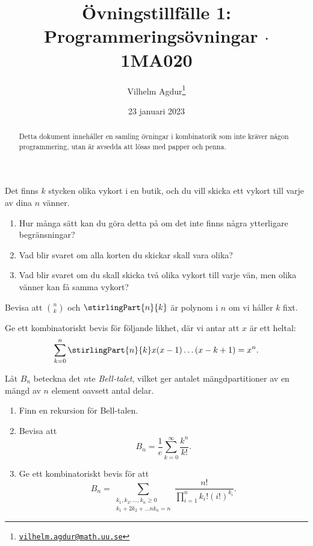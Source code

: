 \documentclass[nobib]{tufte-handout}
\title{Övningstillfälle 1: Programmeringsövningar $\cdot$ 1MA020}
\author[Vilhelm Agdur]{Vilhelm Agdur\thanks{\href{mailto:vilhelm.agdur@math.uu.se}{\nolinkurl{vilhelm.agdur@math.uu.se}}}}
\date{23 januari 2023}
\begin{document}
\maketitle%

\begin{abstract}
\noindent
Detta dokument innehåller en samling övningar i kombinatorik som inte kräver någon programmering, utan är avsedda att lösas med papper och penna.
\end{abstract}

\begin{xca}
    Det finns $k$ stycken olika vykort i en butik, och du vill skicka ett vykort till varje av dina $n$ vänner.

    \begin{enumerate}
        \item Hur många sätt kan du göra detta på om det inte finns några ytterligare begränsningar?
        \item Vad blir svaret om alla korten du skickar skall vara olika?
        \item Vad blir svaret om du skall skicka två olika vykort till varje vän, men olika vänner kan få samma vykort?
    \end{enumerate}
\end{xca}

\begin{xca}
    Bevisa att $\binom{n}{k}$ och $\stirlingPart{n}{k}$ är polynom i $n$ om vi håller $k$ fixt.
\end{xca}

\begin{xca}
    Ge ett kombinatoriskt bevis för följande likhet, där vi antar att $x$ är ett heltal:
    $$\sum_{k = 0}^{n} \stirlingPart{n}{k}x(x-1)\ldots(x-k+1) = x^n.$$
\end{xca}

\begin{xca}
    Låt $B_n$ beteckna det $n$te \emph{Bell-talet}, vilket ger antalet mängdpartitioner av en mängd av $n$ element oavsett antal delar.

    \begin{enumerate}[label = \roman*)]
        \item Finn en rekursion för Bell-talen.
        \item Bevisa att
        $$B_n = \frac{1}{e}\sum_{k = 0}^{\infty} \frac{k^n}{k!}.$$
        \item Ge ett kombinatoriskt bevis för att
        $$B_n = \sum_{\substack{k_1, k_2, \ldots, k_n \geq 0\\k_1 + 2k_2 + \ldots nk_n = n}} \frac{n!}{\prod_{i=1}^{n} k_i!(i!)^{k_i}}.$$
    \end{enumerate}
\end{xca}
\end{document}

